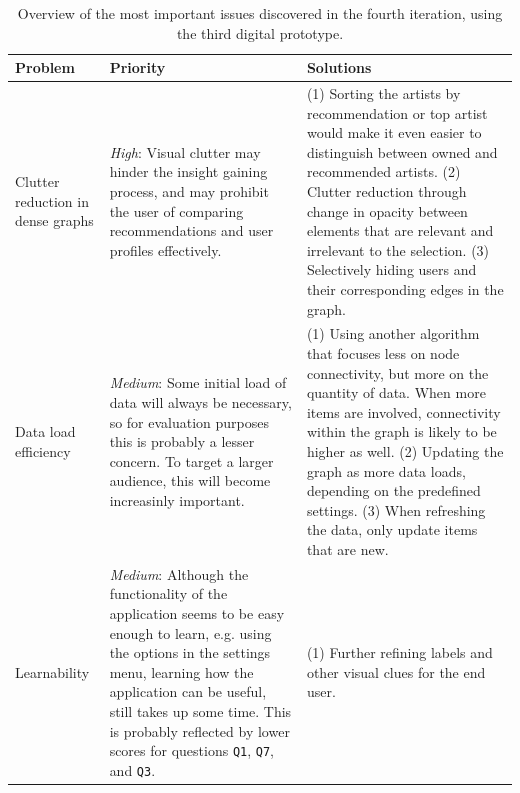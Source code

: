 \begin{table}
	\caption{Overview of the most important issues discovered in the fourth iteration, using the third digital prototype.}
	\begin{center}
		\begin{tabular}{p{70px} | p{180px} | p{180px} }
			\hline
			\textbf{Problem} & \textbf{Priority} & \textbf{Solutions} \\
			\hline
			
			Clutter reduction in dense graphs
			&
			\emph{High}: Visual clutter may hinder the insight gaining process, and may prohibit the user of comparing recommendations and user profiles effectively.
			&
			(1) Sorting the artists by recommendation or top artist would make it even easier to distinguish between owned and recommended artists. (2) Clutter reduction through change in opacity between elements that are relevant and irrelevant to the selection. (3) Selectively hiding users and their corresponding edges in the graph.
			\\
			
			Data load efficiency
			&
			\emph{Medium}: Some initial load of data will always be necessary, so for evaluation purposes this is probably a lesser concern.  To target a larger audience, this will become increasinly important.
			&
			(1) Using another algorithm that focuses less on node connectivity, but more on the quantity of data. When more items are involved, connectivity within the graph is likely to be higher as well. (2) Updating the graph as more data loads, depending on the predefined settings. (3) When refreshing the data, only update items that are new.
			\\
			
			Learnability
			&
			\emph{Medium}: Although the functionality of the application seems to be easy enough to learn, e.g. using the options in the settings menu, learning how the application can be useful, still takes up some time. This is probably reflected by lower scores for questions \texttt{Q1}, \texttt{Q7}, and \texttt{Q3}.
			&
			(1) Further refining labels and other visual clues for the end user.
			\\
			
			\hline
		\end{tabular}
	\end{center}
\label{table:iteration4:issues}
\end{table}
